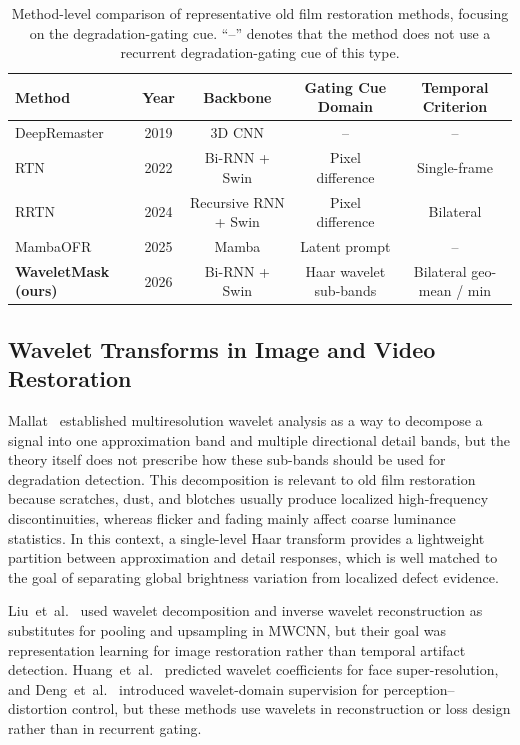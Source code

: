 {\begin{table}[H]
\caption{Method-level comparison of representative old film restoration methods, focusing on the degradation-gating cue. ``--'' denotes that the method does not use a recurrent degradation-gating cue of this type.\label{tab:method_comparison}}
\footnotesize
\begin{tabularx}{\textwidth}{lccCC}
\toprule
\textbf{Method} & \textbf{Year} & \textbf{Backbone} & \textbf{Gating Cue Domain} & \textbf{Temporal Criterion} \\
\midrule
DeepRemaster~\cite{iizuka2019deepremaster} & 2019 & 3D CNN & -- & -- \\
RTN~\cite{rtn2022} & 2022 & Bi-RNN + Swin & Pixel difference & Single-frame \\
RRTN~\cite{rrtn2024} & 2024 & Recursive RNN + Swin & Pixel difference & Bilateral \\
MambaOFR~\cite{mao2025mambaofr} & 2025 & Mamba & Latent prompt & -- \\
\textbf{WaveletMask (ours)} & 2026 & Bi-RNN + Swin & Haar wavelet sub-bands & Bilateral geo-mean / min \\
\bottomrule
\end{tabularx}
\normalsize
\end{table}

\subsection{Wavelet Transforms in Image and Video Restoration}

Mallat~\cite{mallat1989theory} established multiresolution wavelet analysis as a way to decompose a signal into one approximation band and multiple directional detail bands, but the theory itself does not prescribe how these sub-bands should be used for degradation detection. This decomposition is relevant to old film restoration because scratches, dust, and blotches usually produce localized high-frequency discontinuities, whereas flicker and fading mainly affect coarse luminance statistics. In this context, a single-level Haar transform provides a lightweight partition between approximation and detail responses, which is well matched to the goal of separating global brightness variation from localized defect evidence.

Liu~et~al.~\cite{liu2018mwcnn} used wavelet decomposition and inverse wavelet reconstruction as substitutes for pooling and upsampling in MWCNN, but their goal was representation learning for image restoration rather than temporal artifact detection. Huang~et~al.~\cite{huang2017wavelet} predicted wavelet coefficients for face super-resolution, and Deng~et~al.~\cite{deng2019swd} introduced wavelet-domain supervision for perception--distortion control, but these methods use wavelets in reconstruction or loss design rather than in recurrent gating.

}
